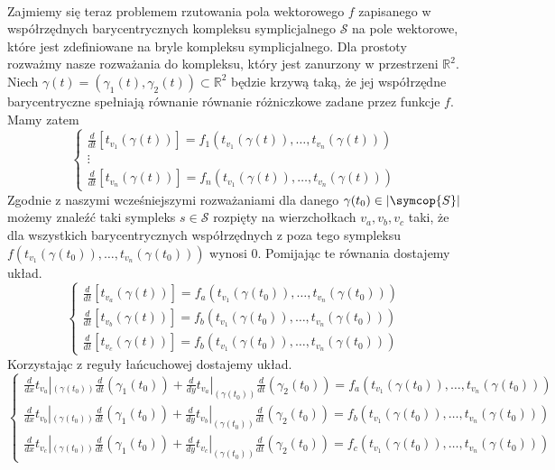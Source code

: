 \documentclass[12pt,a4paper]{article}
\newcommand{\symcom}[1]{\mathcal{#1}}
\begin{document}
\\
Zajmiemy się teraz problemem rzutowania pola wektorowego $f$ zapisanego w współrzędnych barycentrycznych kompleksu symplicjalnego $\symcom{S}$ na pole wektorowe, które jest zdefiniowane na bryle kompleksu symplicjalnego. Dla prostoty rozważmy nasze rozważania do kompleksu, który jest zanurzony w przestrzeni $\mathbb{R}^2$. Niech $\gamma(t)=(\gamma_1(t),\gamma_2(t))\subset\mathbb{R}^2$ będzie krzywą taką, że jej współrzędne barycentryczne spełniają równanie równanie różniczkowe zadane przez funkcje $f$. Mamy zatem 
$$
\begin{cases} 
\frac{d}{dt}[{t}_{v_1}(\gamma(t))] = f_1({t}_{v_1}(\gamma(t)),\ldots,{t}_{v_n}(\gamma(t)))
\\ \vdots  
\\ \frac{d}{dt}[{t}_{v_n}(\gamma(t))] = f_n({t}_{v_1}(\gamma(t)),\ldots,{t}_{v_n}(\gamma(t)))
\end{cases}
$$
Zgodnie z naszymi wcześniejszymi rozważaniami dla danego $\gamma(t_0)\in|\symcop{S}|$ możemy znaleźć taki sympleks $s \in\symcom{S}$ rozpięty na wierzchołkach $v_a,v_b,v_c$ taki, że dla wszystkich barycentrycznych współrzędnych z poza tego sympleksu $f({t}_{v_1}(\gamma(t_0)),\ldots,{t}_{v_n}(\gamma(t_0)))$ wynosi 0.
Pomijając te równania dostajemy układ.
$$
\begin{cases} 
\frac{d}{dt}[{t}_{v_a}(\gamma(t))] = f_a({t}_{v_1}(\gamma(t_0)),\ldots,{t}_{v_n}(\gamma(t_0)))
\\ \frac{d}{dt}[{t}_{v_b}(\gamma(t))] = f_b({t}_{v_1}(\gamma(t_0)),\ldots,{t}_{v_n}(\gamma(t_0)))
\\ \frac{d}{dt}[{t}_{v_c}(\gamma(t))] = f_b({t}_{v_1}(\gamma(t_0)),\ldots,{t}_{v_n}(\gamma(t_0)))
\end{cases}
$$
Korzystając z reguły łańcuchowej dostajemy układ.
$$
\begin{cases} 
\frac{d}{dx}{t}_{v_a}|_{(\gamma(t_0))} \frac{d}{dt}(\gamma_1(t_0)) +\frac{d}{dy}{t}_{v_a}|_{(\gamma(t_0))} \frac{d}{dt}(\gamma_2(t_0))
= f_a({t}_{v_1}(\gamma(t_0)),\ldots,{t}_{v_n}(\gamma(t_0)))
\\ 
\frac{d}{dx}{t}_{v_b}|_{(\gamma(t_0))} \frac{d}{dt}(\gamma_1(t_0)) +\frac{d}{dy}{t}_{v_b}|_{(\gamma(t_0))} \frac{d}{dt}(\gamma_2(t_0))
= f_b({t}_{v_1}(\gamma(t_0)),\ldots,{t}_{v_n}(\gamma(t_0)))
\\ \frac{d}{dx}{t}_{v_c}|_{(\gamma(t_0))} \frac{d}{dt}(\gamma_1(t_0)) +\frac{d}{dy}{t}_{v_c}|_{(\gamma(t_0))} \frac{d}{dt}(\gamma_2(t_0))
= f_c({t}_{v_1}(\gamma(t_0)),\ldots,{t}_{v_n}(\gamma(t_0)))
\end{cases}
$$
\end{document}
